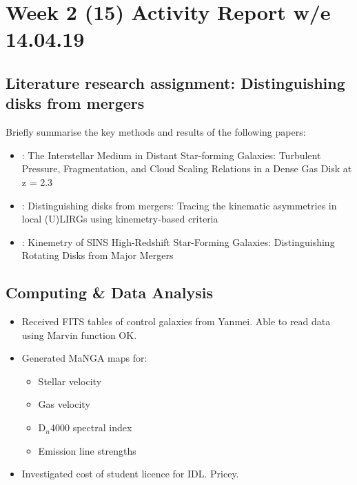 \section{Week 2 (15) Activity Report w/e 14.04.19}
\subsection{Literature research assignment: Distinguishing disks from mergers}
Briefly summarise the key methods and results of the following papers:
\begin{itemize}
    \item \citet{2011ApJ...742...11S} : {The Interstellar Medium in Distant Star-forming Galaxies: Turbulent Pressure, Fragmentation, and Cloud Scaling Relations in a Dense Gas Disk at z = 2.3}
    \item \citet{2016A&A...591A..85B} : {Distinguishing disks from mergers: Tracing the kinematic asymmetries in local (U)LIRGs using kinemetry-based criteria}
    \item \citet{2008ApJ...682..231S} : {Kinemetry of SINS High-Redshift Star-Forming Galaxies: Distinguishing Rotating Disks from Major Mergers}
\end{itemize}

\subsection{Computing \& Data Analysis}
\begin{itemize}
    \item {Received FITS tables of control galaxies from Yanmei. Able to read data using Marvin function OK.}
    \item Generated MaNGA maps for:
    \begin{itemize} 
        \item Stellar velocity
        \item Gas velocity
        \item D$_n$4000 spectral index
        \item Emission line strengths
    \end{itemize}
    \item Investigated cost of student licence for IDL. Pricey.
\end{itemize}

